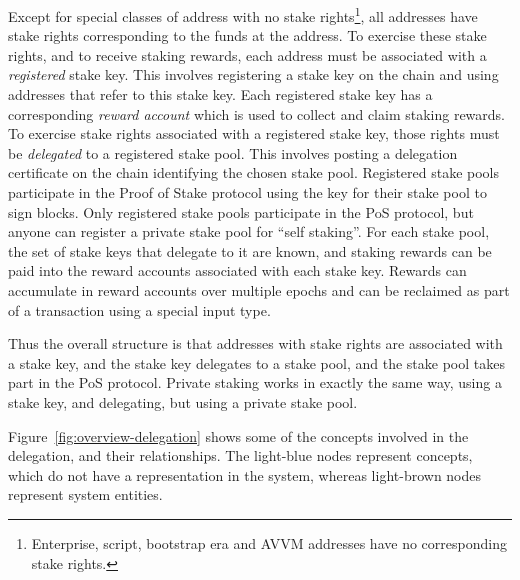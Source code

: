 \documentclass[11pt,a4paper]{article}
\begin{document}
Except for special classes of address with no stake rights\footnote{Enterprise,
  script, bootstrap era and AVVM addresses have no corresponding stake
  rights.}, all addresses have stake rights corresponding to the funds
at the address. To exercise these stake rights, and to receive staking
rewards, each address must be associated with a \emph{registered} stake
key. This involves registering a stake key on the chain and using
addresses that refer to this stake key. Each registered stake key has a
corresponding \emph{reward account} which is used to collect and claim
staking rewards. To exercise stake rights associated with a registered
stake key, those rights must be \emph{delegated} to a registered stake pool.
This involves posting a delegation certificate on the chain identifying
the chosen stake pool. Registered stake pools participate in the Proof
of Stake protocol using the key for their stake pool to sign blocks.
Only registered stake pools participate in the PoS protocol, but anyone
can register a private stake pool for ``self staking''. For each stake
pool, the set of stake keys that delegate to it are known, and staking
rewards can be paid into the reward accounts associated with each stake
key. Rewards can accumulate in reward accounts over multiple epochs and
can be reclaimed as part of a transaction using a special input type.

Thus the overall structure is that addresses with stake rights are
associated with a stake key, and the stake key delegates to a stake
pool, and the stake pool takes part in the PoS protocol. Private staking
works in exactly the same way, using a stake key, and delegating, but
using a private stake pool.

Figure~\ref{fig:overview-delegation} shows some of the concepts involved in the
delegation, and their relationships. The light-blue nodes represent concepts, which
do not have a representation in the system, whereas light-brown nodes represent
system entities.
\end{document}

